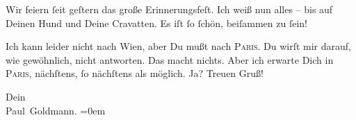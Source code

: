 \pstart
           Wir feiern ſeit geſtern das große Erinnerungsfeſt. Ich weiß nun alles – bis auf
               Deinen Hund und Deine Cravatten. Es iſt ſo ſchön, beiſammen zu ſein!\pend
           
\pstart
           Ich kann leider nicht nach Wien, aber Du mußt nach
                  \textsc{Paris}. Du wirſt mir darauf, wie gewöhnlich, nicht antworten. Das macht nichts. Aber
               ich  erwarte Dich in \textsc{Paris}, nächſtens, ſo nächſtens als möglich. Ja? Treuen Gruß!\pend
           
\pstart
           Dein{\\[\baselineskip]}\spacefill\mbox{Paul Goldmann.}\pend
           \leftskip=0em{}\endnumbering{}  
      